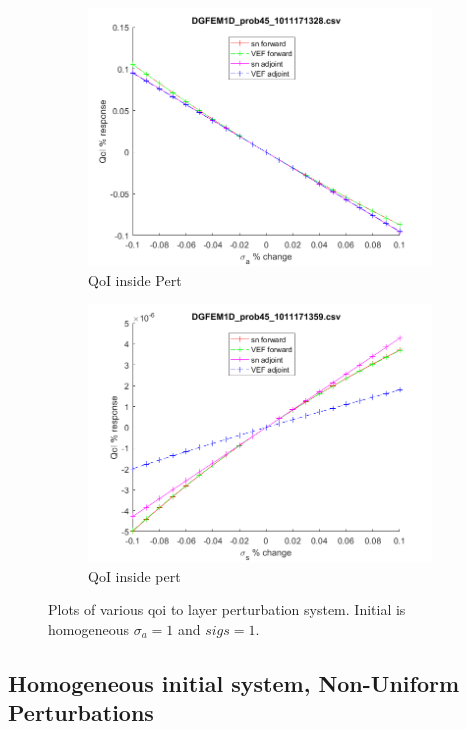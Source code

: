 \documentclass[12pt]{report}
\newcommand{\siga}{\sigma_a}
\begin{document}
\begin{figure}[H]
\begin{subfigure}{.5\textwidth}
  \includegraphics[width=.98\linewidth]{figures/45sigaSens.png}
  \caption{QoI inside Pert}
  \label{fig:sfig3}
\end{subfigure}%
\begin{subfigure}{.5\textwidth}
  \centering
  \includegraphics[width=.98\linewidth]{figures/45sigsSens.png}
  \caption{QoI inside pert}
  \label{fig:sfig6}
\end{subfigure}%
\caption{Plots of various qoi to layer perturbation system. Initial is homogeneous $\siga=1$ and $sigs=1$.}
\label{fig:fig}
\end{figure}

\subsection{Homogeneous initial system, Non-Uniform Perturbations}
\end{document}

